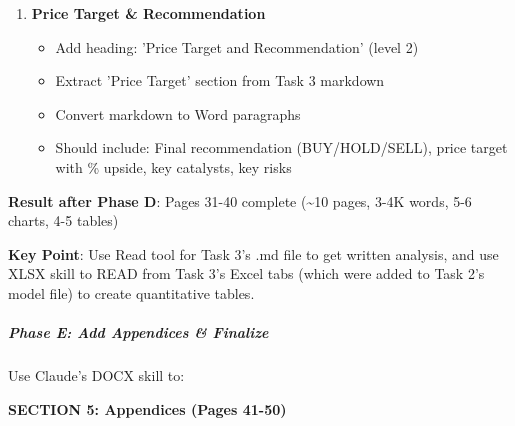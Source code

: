 \documentclass[11pt]{article}
\begin{document}
\begin{enumerate}[leftmargin=*,itemsep=2pt,topsep=2pt]
\begin{itemize}[leftmargin=*,itemsep=2pt,topsep=2pt]
\item {} \textbf{Create Table: Valuation Summary}
\begin{itemize}[leftmargin=*,itemsep=2pt,topsep=2pt]
\item {} Use XLSX skill to read Valuation Summary tab
\item {} Extract valuation methods (DCF, Comps, Precedent Transactions if applicable)
\item {} Create Word table showing: Method, Low Case, Base Case, High Case, Weight, Weighted Value
\end{itemize}
\end{itemize}
\item {} \textbf{Price Target \& Recommendation}
\begin{itemize}[leftmargin=*,itemsep=2pt,topsep=2pt]
\item {} Add heading: 'Price Target and Recommendation' (level 2)
\item {} Extract 'Price Target' section from Task 3 markdown
\item {} Convert markdown to Word paragraphs
\item {} Should include: Final recommendation (BUY/HOLD/SELL), price target with \% upside, key catalysts, key risks
\end{itemize}
\end{enumerate}

\textbf{Result after Phase D}: Pages 31-40 complete (\textasciitilde{}10 pages, 3-4K words, 5-6 charts, 4-5 tables)


\textbf{Key Point}: Use Read tool for Task 3's .md file to get written analysis, and use XLSX skill to READ from Task 3's Excel tabs (which were added to Task 2's model file) to create quantitative tables.


\subparagraph{Phase E: Add Appendices \& Finalize}\mbox{}\par

Use Claude's DOCX skill to:


\textbf{SECTION 5: Appendices (Pages 41-50)}
\end{document}
